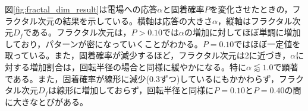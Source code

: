 \documentclass[autodetect-engine,dvi=dvipdfmx,a4paper,ja=standard,oneside,openany,11pt,draft]{bxjsbook}
\begin{document}
図\ref{fig:fractal_dim_result}は電場への応答$\alpha$と固着確率$P$を変化させたときの，フラクタル次元の結果を示している。横軸は応答の大きさ$\alpha$，縦軸はフラクタル次元$D_f$である。フラクタル次元は，$P>0.10$では$\alpha$の増加に対してほぼ単調に増加しており，パターンが密になっていくことがわかる。$P=0.10$ではほぼ一定値を取っている。また，固着確率が減少するほど，フラクタル次元は2に近づき，$\alpha$に対する増加割合は，回転半径の場合と同様に緩やかになる。特に$\alpha\lessapprox1.0$で顕著である。また，固着確率が線形に減少(0.3ずつ)しているにもかかわらず，フラクタル次元$D_f$は線形に増加しておらず，回転半径と同様に$P=0.10$と$P=0.40$の間に大きなとびがある。
\ifdraft{
  
  
}{}
\end{document}
